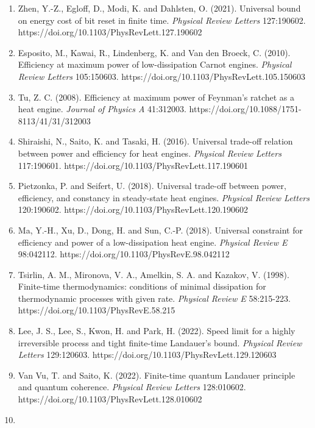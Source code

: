 \documentclass[
  10pt,
]{article}
\begin{document}
\begin{enumerate}
  Proesmans, K., Ehrich, J. and Bechhoefer, J. (2020). Optimal
  finite-time bit erasure under full control. \emph{Physical Review E}
  102:032105. https://doi.org/10.1103/PhysRevE.102.032105
\item
  Zhen, Y.-Z., Egloff, D., Modi, K. and Dahlsten, O. (2021). Universal
  bound on energy cost of bit reset in finite time. \emph{Physical
  Review Letters} 127:190602.
  https://doi.org/10.1103/PhysRevLett.127.190602
\item
  Esposito, M., Kawai, R., Lindenberg, K. and Van den Broeck, C. (2010).
  Efficiency at maximum power of low-dissipation Carnot engines.
  \emph{Physical Review Letters} 105:150603.
  https://doi.org/10.1103/PhysRevLett.105.150603
\item
  Tu, Z. C. (2008). Efficiency at maximum power of Feynman's ratchet as
  a heat engine. \emph{Journal of Physics A} 41:312003.
  https://doi.org/10.1088/1751-8113/41/31/312003
\item
  Shiraishi, N., Saito, K. and Tasaki, H. (2016). Universal trade-off
  relation between power and efficiency for heat engines. \emph{Physical
  Review Letters} 117:190601.
  https://doi.org/10.1103/PhysRevLett.117.190601
\item
  Pietzonka, P. and Seifert, U. (2018). Universal trade-off between
  power, efficiency, and constancy in steady-state heat engines.
  \emph{Physical Review Letters} 120:190602.
  https://doi.org/10.1103/PhysRevLett.120.190602
\item
  Ma, Y.-H., Xu, D., Dong, H. and Sun, C.-P. (2018). Universal
  constraint for efficiency and power of a low-dissipation heat engine.
  \emph{Physical Review E} 98:042112.
  https://doi.org/10.1103/PhysRevE.98.042112
\item
  Tsirlin, A. M., Mironova, V. A., Amelkin, S. A. and Kazakov, V.
  (1998). Finite-time thermodynamics: conditions of minimal dissipation
  for thermodynamic processes with given rate. \emph{Physical Review E}
  58:215-223. https://doi.org/10.1103/PhysRevE.58.215
\item
  Lee, J. S., Lee, S., Kwon, H. and Park, H. (2022). Speed limit for a
  highly irreversible process and tight finite-time Landauer's bound.
  \emph{Physical Review Letters} 129:120603.
  https://doi.org/10.1103/PhysRevLett.129.120603
\item
  Van Vu, T. and Saito, K. (2022). Finite-time quantum Landauer
  principle and quantum coherence. \emph{Physical Review Letters}
  128:010602. https://doi.org/10.1103/PhysRevLett.128.010602
\item

\end{enumerate}
\end{document}
